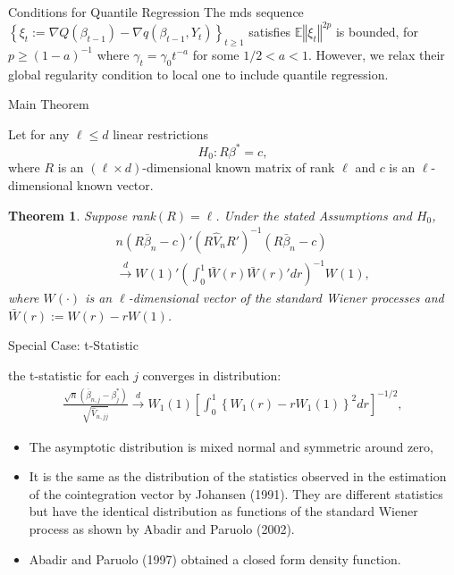 \documentclass[beamer, t]{beamer}
\newtheorem{thm}{Theorem}[section]
\begin{document}
\begin{frame}{Conditions for Quantile Regression}
{	The mds sequence $\left\{ \xi_{t}:=\nabla Q\left(\beta_{t-1}\right)-\nabla q\left(\beta_{t-1},Y_{t}\right) \right\}_{t\geq1}$ satisfies
	$\mathbb{E}\left\Vert \xi_{t}\right\Vert ^{2p}$
	is bounded, for $p\geq\left(1-a\right)^{-1}$ where $\gamma_{t}=\gamma_0 t^{-a} $ for some $1/2 < a <1$. However, we relax their global regularity condition to local one to include quantile regression.
}
	
\end{frame}


 \begin{frame}{Main Theorem}

Let for any $\ell \leq d$ linear restrictions
\[
H_{0}: R\beta^{*} = c,
\]
where $R$ is  an $(\ell \times d)$-dimensional known matrix of  rank $\ell$
and
$c$ is an $\ell$-dimensional known vector.
\begin{thm}
\label{thm:Wald} Suppose rank$(R)=\ell$. Under the stated  Assumptions and $H_{0}$,
\begin{eqnarray*}
&&n\left(R\bar{\beta}_{n}-c\right)'\left(R\widehat{V}_{n}R'\right)^{-1}\left(R\bar{\beta}_{n}-c\right)\\
&& \overset{d}{\to}W\left(1\right)'\left(\int_{0}^{1}\bar{W}(r)\bar{W}(r)'dr\right)^{-1}W\left(1\right),
\end{eqnarray*}
where $W(\cdot)$ is an $\ell$-dimensional vector of the standard Wiener
processes and $\bar{W}\left(r\right):=W\left(r\right)-rW\left(1\right)$.
\end{thm}

\end{frame}


\begin{frame}{Special Case: t-Statistic}

the t-statistic for each $ j $ converges in distribution:
\begin{align*}\label{t-stat-limit}
\frac{\sqrt{n}\left(\bar{\beta}_{n,j}-\beta_{j}^{*}\right)}{\sqrt{\widehat{V}_{n,jj}}}
\overset{d}{\to}
W_1\left(1\right)  \left[ \int_{0}^{1} \left\{ W_1\left(r\right)-rW_1\left(1\right) \right\}^2 dr\right]^{-1/2},
\end{align*}

 \begin{itemize}
 	\item 
 	The asymptotic distribution is mixed normal and symmetric around zero,
 	
 	\item It  is the same as the distribution of the statistics observed in the estimation of the cointegration vector by Johansen  (1991). They are different statistics but have the identical distribution as functions of the standard Wiener process as shown by Abadir and Paruolo (2002).
 	
 	\item Abadir and Paruolo (1997) obtained a closed form density function. 
 \end{itemize}

\end{frame}
\end{document}

